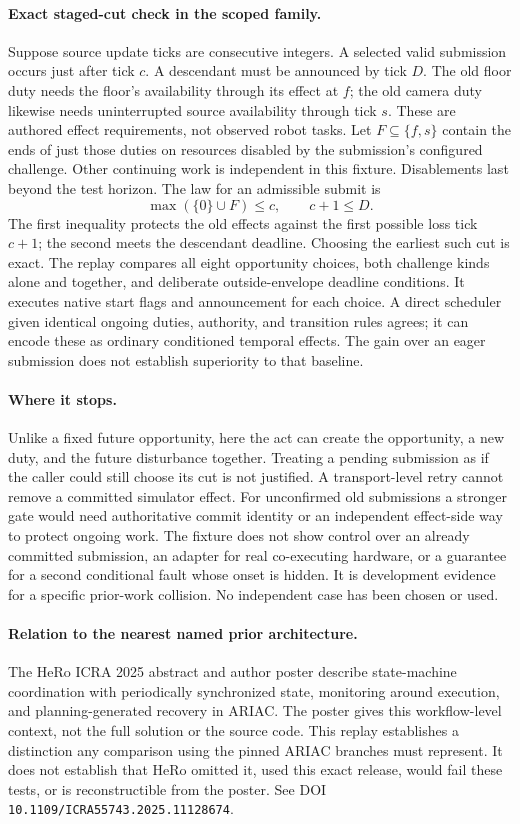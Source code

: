 \documentclass{article}
\begin{document}
\paragraph{Exact staged-cut check in the scoped family.}
Suppose source update ticks are consecutive integers.
A selected valid submission occurs just after tick \(c\).
A descendant must be announced by tick \(D\). The old floor duty
needs the floor's availability through its effect at \(f\); the
old camera duty likewise needs uninterrupted source availability
through tick \(s\). These are authored effect requirements, not
observed robot tasks. Let \(F\subseteq\{f,s\}\) contain the ends
of just those duties on resources disabled by the submission's
configured challenge. Other continuing work is independent in
this fixture. Disablements last beyond the test horizon.
The law for an admissible submit is
\[
  \max(\{0\}\cup F)\le c,\qquad c+1\le D.
\]
The first inequality protects the old effects against the first
possible loss tick \(c+1\); the second meets the descendant
deadline. Choosing the earliest such cut is exact. The replay
compares all eight opportunity choices, both challenge kinds
alone and together, and deliberate outside-envelope deadline
conditions. It executes native start flags and announcement for
each choice. A direct scheduler given identical ongoing duties,
authority, and transition rules agrees; it can encode these
as ordinary conditioned temporal effects. The gain over an eager
submission does not establish superiority to that baseline.

\paragraph{Where it stops.}
Unlike a fixed future opportunity, here the act can create the
opportunity, a new duty, and the future disturbance together.
Treating a pending submission as if the caller could still choose
its cut is not justified. A transport-level retry cannot remove
a committed simulator effect. For unconfirmed old submissions
a stronger gate would need authoritative commit identity or an
independent effect-side way to protect ongoing work. The fixture
does not show control over an already committed submission, an
adapter for real co-executing hardware, or a guarantee for a
second conditional fault whose onset is hidden. It is development
evidence for a specific prior-work collision. No independent case
has been chosen or used.

\paragraph{Relation to the nearest named prior architecture.}
The HeRo ICRA 2025 abstract and author poster describe state-machine
coordination with periodically synchronized state, monitoring
around execution, and planning-generated recovery in ARIAC.
The poster gives this workflow-level context, not the full solution
or the source code. This replay establishes a distinction any
comparison using the pinned ARIAC branches must represent. It does
not establish that HeRo omitted it, used this exact release,
would fail these tests, or is reconstructible from the poster.
See DOI \texttt{10.1109/ICRA55743.2025.11128674}.
\end{document}
